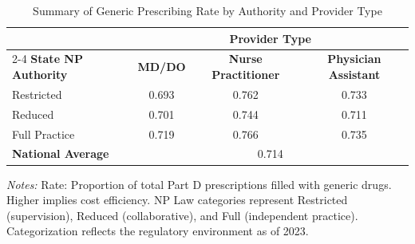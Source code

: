 \begin{table}[htbp]
    \centering
    \caption{Summary of Generic Prescribing Rate by Authority and Provider Type}
    \label{tab:partd_generic_rate}
    \vspace{0.2cm}
    \begin{tabular}{lccc}
        \toprule
        & \multicolumn{3}{c}{\textbf{Provider Type}} \\
        \cmidrule(lr){2-4}
        \textbf{State NP Authority} & \textbf{MD/DO} & \textbf{Nurse Practitioner} & \textbf{Physician Assistant} \\
        \midrule
        Restricted & 0.693 & 0.762 & 0.733 \\
        Reduced & 0.701 & 0.744 & 0.711 \\
        Full Practice & 0.719 & 0.766 & 0.735 \\
        \midrule
        \textbf{National Average} & \multicolumn{3}{c}{0.714} \\
        \bottomrule
    \end{tabular}
    \vspace{0.1cm}
    \begin{minipage}{0.85\textwidth}
        \footnotesize \textit{Notes:} Rate: Proportion of total Part D prescriptions filled with generic drugs. Higher implies cost efficiency. NP Law categories represent Restricted (supervision), Reduced (collaborative), and Full (independent practice). Categorization reflects the regulatory environment as of 2023.
    \end{minipage}
\end{table}